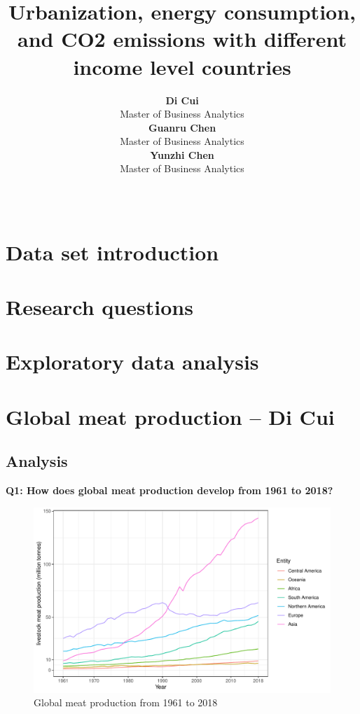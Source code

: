 \documentclass[11pt,a4paper,]{article}
\title{Urbanization, energy consumption, and CO2 emissions with different income level countries}
\author{\sf\Large\textbf{ Di Cui}\\ {\sf\large Master of Business Analytics\\[0.5cm]} \sf\Large\textbf{ Guanru Chen}\\ {\sf\large Master of Business Analytics\\[0.5cm]} \sf\Large\textbf{ Yunzhi Chen}\\ {\sf\large Master of Business Analytics\\[0.5cm]}}
\date{\sf\Date~\Month~\Year}
\makeatletter
\def\titlepage{\front{\expandafter{\@title}}{\@author}{\@organization}}
\makeatother
\begin{document}
\titlepage

\hypertarget{data-set-introduction}{%
\section{Data set introduction}\label{data-set-introduction}}

\hypertarget{research-questions}{%
\section{Research questions}\label{research-questions}}

\clearpage

\hypertarget{exploratory-data-analysis}{%
\section{Exploratory data analysis}\label{exploratory-data-analysis}}

\section*{Global meat production -- Di Cui}

\subsection*{Analysis}

\textbf{Q1: How does global meat production develop from 1961 to 2018?}

\begin{figure}
\centering
\includegraphics{report_files/figure-latex/continent-figure-1.pdf}
\caption{\label{fig:continent-figure}Global meat production from 1961 to 2018}
\end{figure}
\end{document}
